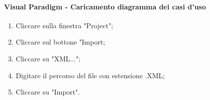 \paragraph{Visual Paradigm - Caricamento diagramma dei casi d'uso}
\begin{enumerate}
	\item Cliccare sulla finestra "Project";
	\item Cliccare sul bottone "Import;
	\item Cliccare su "XML...";
	\item Digitare il percorso del file con estensione .XML;
	\item Cliccare su "Import".
\end{enumerate}
